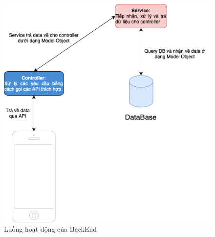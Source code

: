 \documentclass[../DoAn.tex]{subfiles}
\begin{document}
\begin{figure}[H]
    \centering
    \includegraphics[width=1\linewidth]{Hinhve/Architecture/System_Data_Flow.png}
    \caption{Luồng hoạt động của BackEnd}
    \label{fig:use_case_tổng_quan}
\end{figure}
\end{document}
